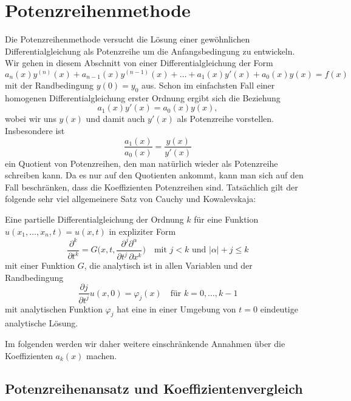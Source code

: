 %
%
%
\section{Potenzreihenmethode
\label{buch:differentialgleichungen:section:potenzreihenmethode}}
Die Potenzreihenmethode versucht die Lösung einer gewöhnlichen
Differentialgleichung als Potenzreihe um die Anfangsbedingung zu
entwickeln.
Wir gehen in diesem Abschnitt von einer Differentialgleichung der
Form
\begin{equation}
a_n(x)y^{(n)}(x)
+
a_{n-1}(x)y^{(n-1)}(x)
+
\dots
+
a_1(x)y'(x)
+
a_0(x)y(x)
=
f(x)
\label{buch:differentialgleichungen:eqn:potenzreihendgl}
\end{equation}
mit der Randbedingung $y(0)=y_0$ aus.
Schon im einfachsten Fall einer homogenen Differentialgleichung erster
Ordnung ergibt sich die Beziehung
\[
a_1(x) y'(x) = a_0(x)y(x),
\]
wobei wir uns $y(x)$ und damit auch $y'(x)$ als Potenzreihe vorstellen.
Insbesondere ist 
\[
\frac{a_1(x)}{a_0(x)} = \frac{y(x)}{y'(x)}
\]
ein Quotient von Potenzreihen, den man natürlich wieder als 
Potenzreihe schreiben kann.
Da es nur auf den Quotienten ankommt, kann man sich auf den Fall
beschränken, dass die Koeffizienten Potenzreihen sind.
Tatsächlich gilt der folgende sehr viel allgemeinere Satz von
Cauchy und Kowalevskaja:

\begin{satz}
Eine partielle Differentialgleichung der Ordnung $k$ für eine
Funktion $u(x_1,\dots,x_n,t)=u(x,t)$ 
in expliziter Form
\[
\frac{\partial^k}{\partial t^k}
=
G\biggl(x,t,
\frac{\partial^j\partial^\alpha}{\partial t^j\,\partial x^k}
\biggr)
\quad\text{mit $j<k$ und $|\alpha|+j\le k$}
\]
mit einer Funktion $G$, die analytisch ist in allen Variablen
und der Randbedingung
\[
\frac{\partial j}{\partial t^j}u(x,0) = \varphi_j(x)\quad\text{für $k=0,\dots,k-1$}
\]
mit analytischen Funktion $\varphi_j$ hat eine in einer Umgebung von 
$t=0$ eindeutige analytische Lösung.
\end{satz}

Im folgenden werden wir daher weitere einschränkende Annahmen über
die Koeffizienten $a_k(x)$ machen.

\subsection{Potenzreihenansatz und Koeffizientenvergleich}



